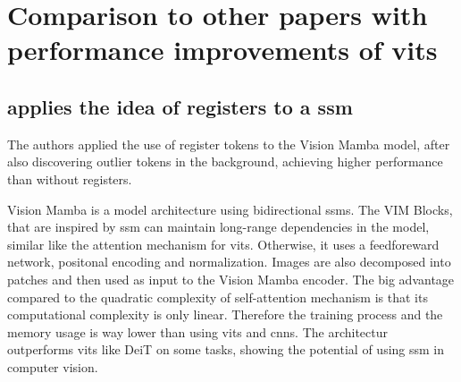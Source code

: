 \documentclass[conference]{IEEEtran}
\begin{document}



  \section{Comparison to other papers with performance improvements of \ac{vit}s}

  \subsection{\cite{mamba-needs-registers} applies the idea of registers to a \ac{ssm}}
  The authors applied the use of register tokens to the Vision Mamba model, after also discovering outlier tokens in the background, achieving higher performance than without registers. 
  
  Vision Mamba \cite{vision-mamba} is a model architecture using bidirectional \acfp{ssm}. The VIM Blocks, that are inspired by \ac{ssm} can maintain long-range dependencies in the model, similar like the attention mechanism for \acp{vit}. Otherwise, it uses a feedforeward network, positonal encoding and normalization. Images are also decomposed into patches and then used as input to the Vision Mamba encoder. The big advantage compared to the quadratic complexity of self-attention mechanism is that its computational complexity is only linear. Therefore the training process and the memory usage is way lower than using \acp{vit} and \acp{cnn}. The architectur outperforms \acp{vit} like DeiT \cite{deit} on some tasks, showing the potential of using \ac{ssm} in computer vision. \cite{vision-mamba} \cite{mamba-needs-registers}
  
\end{document}
